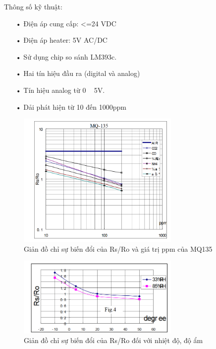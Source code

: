 Thông số kỹ thuật:
\begin{itemize}
\item[•]Điện áp cung cấp: <=24 VDC
\item[•]Điện áp heater: 5V AC/DC
\item[•]Sử dụng chip so sánh LM393c.
\item[•]Hai tín hiệu đầu ra (digital và analog)
\item[•]Tín hiệu analog từ 0 ~ 5V.
\item[•]Dải phát hiện từ 10 đến 1000ppm
\end{itemize}
\begin{center}
\begin{figure}[htp]
\centering    
\includegraphics[width=0.7\textwidth]{mq135_mqh1}
\caption[Giản đồ chỉ sự biến đổi của Rs/Ro và giá trị ppm của MQ135]{Giản đồ chỉ sự biến đổi của Rs/Ro và giá trị ppm của MQ135}
\label{fig:mq135_mqh1}
\end{figure}
\end{center}
\begin{center}
\begin{figure}[htp]
\centering    
\includegraphics[width=0.7\textwidth]{mq135_mqh2}
\caption[Giản đồ chỉ sự biến đổi của Rs/Ro đối với nhiệt độ, độ ẩm]{Giản đồ chỉ sự biến đổi của Rs/Ro đối với nhiệt độ, độ ẩm}
\label{fig:mq135_mqh2}
\end{figure}
\end{center}

